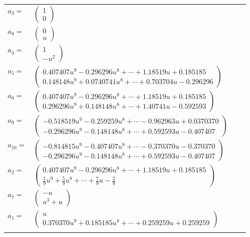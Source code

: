 \documentclass[1p]{elsarticle_modified}
\theoremstyle{definition}
\begin{document}
\begin{tabular}{m{7pt} m{180pt} m{7pt} m{180pt} }
\flushright $a_{3}=$&$\begin{pmatrix}1\\0\end{pmatrix}$ \\
\flushright $a_{8}=$&$\begin{pmatrix}0\\u\end{pmatrix}$ \\
\flushright $a_{4}=$&$\begin{pmatrix}1\\- u^2\end{pmatrix}$ \\
\flushright $a_{5}=$&$\begin{pmatrix}0.407407 u^{9}-0.296296 u^{8}+\cdots+1.18519 u+0.185185\\0.148148 u^{9}+0.0740741 u^{8}+\cdots+0.703704 u-0.296296\end{pmatrix}$ \\
\flushright $a_{6}=$&$\begin{pmatrix}0.407407 u^{9}-0.296296 u^{8}+\cdots+1.18519 u+0.185185\\0.296296 u^{9}+0.148148 u^{8}+\cdots+1.40741 u-0.592593\end{pmatrix}$ \\
\flushright $a_{9}=$&$\begin{pmatrix}-0.518519 u^{9}-0.259259 u^{8}+\cdots-0.962963 u+0.0370370\\-0.296296 u^{9}-0.148148 u^{8}+\cdots+0.592593 u-0.407407\end{pmatrix}$ \\
\flushright $a_{10}=$&$\begin{pmatrix}-0.814815 u^{9}-0.407407 u^{8}+\cdots-0.370370 u-0.370370\\-0.296296 u^{9}-0.148148 u^{8}+\cdots+0.592593 u-0.407407\end{pmatrix}$ \\
\flushright $a_{2}=$&$\begin{pmatrix}0.407407 u^{9}-0.296296 u^{8}+\cdots+1.18519 u+0.185185\\\frac{1}{9} u^9+\frac{5}{9} u^8+\cdots+\frac{7}{9} u-\frac{2}{9}\end{pmatrix}$ \\
\flushright $a_{7}=$&$\begin{pmatrix}- u\\u^3+u\end{pmatrix}$ \\
\flushright $a_{1}=$&$\begin{pmatrix}u\\0.370370 u^{9}+0.185185 u^{8}+\cdots+0.259259 u+0.259259\end{pmatrix}$\\&\end{tabular}
\end{document}

